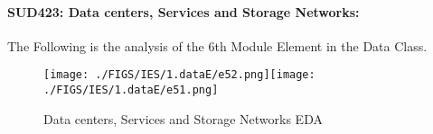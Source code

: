 \documentclass[12pt]{extreport}
\begin{document}
\paragraph{\large SUD423: Data centers, Services and Storage Networks:\\
} 
The Following is the analysis of the 6th Module Element in the Data Class.

\begin{figure}[H]
	\centering
	\texttt{[image: ./FIGS/IES/1.dataE/e52.png]}\texttt{[image: ./FIGS/IES/1.dataE/e51.png]}
	\caption{Data centers, Services and Storage Networks EDA}
	\label{fig:11}
\end{figure}



\begin{comment}

\subparagraph{Interpretation of the Box-plots:}

The numbers Below and the boxplots above show that in this element  PSI and TSI students performance is roughly equivalent
and that their performance is almost better than half of the MP students.

\begin{enumerate}
	\item The MP Class Box-Plot:
	\begin{enumerate}
		\item MAX = 15.5 {} {} {} {} {} {} {} {} UQ = 15 {} {} {} {} {} {} {} {} Median = 14			
		\item LQ = 13 {} {} {} {} {} {} {} {} MIN =	12.5 {} {} {} {} {} {} {} {} IQR = 15 - 13 = 2	
	\end{enumerate}
	\item The PSI Class Box-Plot:
	\begin{enumerate}
		\item MAX = 15.5 {} {} {} {} {} {} {} {} UQ = 15 {} {} {} {} {} {} {} {} Median = 12.5			
		\item LQ = 13 {} {} {} {} {} {} {} {} MIN =	12.5 {} {} {} {} {} {} {} {} IQR = 15 - 12.5 = 2.5	
	\end{enumerate}
	\item The TSI Class Box-Plot:
	\begin{enumerate}
		\item MAX = 15.5 {} {} {} {} {} {} {} {} UQ = 15 {} {} {} {} {} {} {} {} Median = 13.5		
		\item LQ = 13 {} {} {} {} {} {} {} {} MIN =	13 {} {} {} {} {} {} {} {} IQR = 15 - 13 = 2	
	\end{enumerate}
\end{enumerate}



\end{comment}
\end{document}
